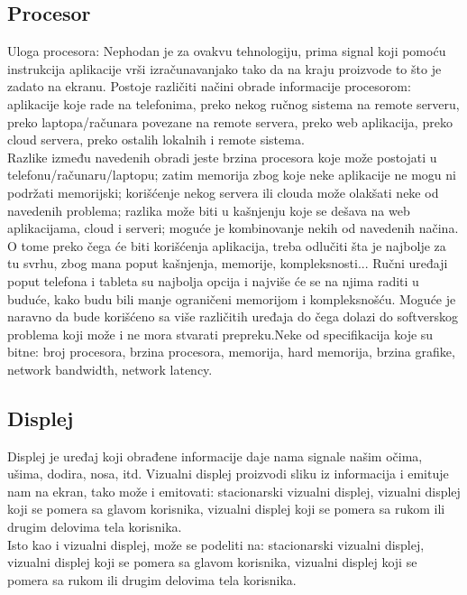 \documentclass[a4paper]{article}
\begin{document}
	\subsection{Procesor}
    \label{sec:Procesor}
    Uloga procesora: Nephodan je za ovakvu tehnologiju, prima signal koji pomoću instrukcija aplikacije vrši izračunavanjako tako da na kraju proizvode to što je zadato na ekranu. Postoje različiti načini obrade informacije procesorom: aplikacije koje rade na telefonima, preko nekog ručnog sistema na remote serveru, preko laptopa/računara povezane na remote servera, preko web aplikacija, preko cloud servera, preko ostalih lokalnih i remote sistema.\\
	Razlike između navedenih obradi jeste brzina procesora koje može postojati u telefonu/računaru/laptopu; zatim memorija zbog koje neke aplikacije ne mogu ni podržati memorijski; korišćenje nekog servera ili clouda može olakšati neke od navedenih problema; razlika može biti u kašnjenju koje se dešava na web aplikacijama, cloud i serveri; moguće je kombinovanje nekih od navedenih načina. \\
	O tome preko čega će biti korišćenja aplikacija, treba odlučiti šta je najbolje za tu svrhu, zbog mana poput kašnjenja, memorije, kompleksnosti... Ručni uređaji poput telefona i tableta su najbolja opcija i najviše će se na njima raditi u buduće, kako budu bili manje ograničeni memorijom i kompleksnošću. Moguće je naravno da bude korišćeno sa više različitih uređaja do čega dolazi do softverskog problema koji može i ne mora stvarati prepreku.Neke od specifikacija koje su bitne: broj procesora, brzina procesora, memorija, hard memorija, brzina grafike, network bandwidth, network latency.\\
	\subsection{Displej}
    \label{sec:Displej}
	Displej je uređaj koji obrađene informacije daje nama signale našim očima, ušima, dodira, nosa, itd. Vizualni displej proizvodi sliku iz informacija i emituje nam na ekran, tako može i emitovati:  stacionarski vizualni displej, vizualni displej koji se pomera sa glavom korisnika, vizualni displej koji se pomera sa rukom ili drugim delovima tela korisnika.\\
	Isto kao i vizualni displej, može se podeliti na: stacionarski vizualni displej, vizualni displej koji se pomera sa glavom korisnika, vizualni displej koji se pomera sa rukom ili drugim delovima tela korisnika. \\
	
\end{document}
